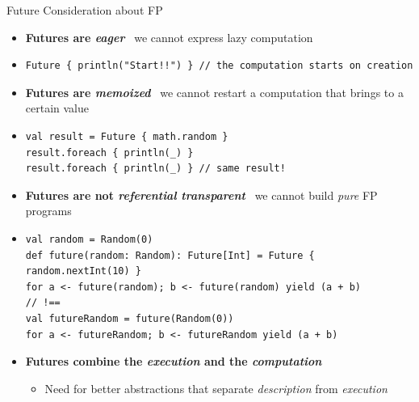 \documentclass[presentation, 9pt]{beamer}\mode<presentation>{\usetheme{AMSBolognaFC}}
\begin{document}
\begin{frame}[fragile]{Future Consideration about FP}
\begin{itemize}
	\item \textbf{Futures are \emph{eager}} \faArrowRight \, we cannot express lazy computation
	\item[] 	\begin{tcolorbox}[left=0pt, top=0pt, bottom=0pt]
		\begin{verbatim}
Future { println("Start!!") } // the computation starts on creation
		\end{verbatim}
	\end{tcolorbox}
	\item \textbf{Futures are \emph{memoized}} \faArrowRight \, we cannot restart a computation that brings to a certain value
	 \item[] 	\begin{tcolorbox}[left=0pt, top=0pt, bottom=0pt]
		\begin{verbatim}
val result = Future { math.random }
result.foreach { println(_) }
result.foreach { println(_) } // same result!
		\end{verbatim}
	\end{tcolorbox}
  \item \textbf{Futures are not \emph{referential transparent}} \faArrowRight \, we cannot build \emph{pure} FP programs
	\item[] 	\begin{tcolorbox}[left=0pt, top=0pt, bottom=0pt]
		\begin{verbatim}
val random = Random(0)
def future(random: Random): Future[Int] = Future { random.nextInt(10) }
for a <- future(random); b <- future(random) yield (a + b)
// !==
val futureRandom = future(Random(0))
for a <- futureRandom; b <- futureRandom yield (a + b)
		\end{verbatim}
	\end{tcolorbox}
	\item \textbf{Futures combine the \emph{execution} and the \emph{computation}}
	\begin{itemize}
		\item[$\Rightarrow$] Need for better abstractions that separate \emph{description} from \emph{execution}
	\end{itemize}
\end{itemize}
\end{frame}
\end{document}
